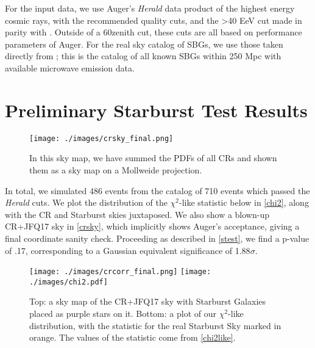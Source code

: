 For the input data, we use Auger's \textit{Herald} data product of the highest energy cosmic rays, with the recommended quality cuts, and the \textgreater 40 EeV cut made in parity with . Outside of a 60\degree zenith cut, these cuts are all based on performance parameters of Auger. For the real sky catalog of SBGs, we use those taken directly from \textcite{starburst}; this is the catalog of all known SBGs within 250 Mpc with available microwave emission data. 
%
 
\section{Preliminary Starburst Test Results}%
\begin{figure}[H]
\centering
\texttt{[image: ./images/crsky\_final.png]}
\caption[CR Sky + JFQ17 Modulation]{In this sky map, we have summed the PDFs of all CRs and shown them as a sky map on a Mollweide projection.}
\label{crsky}
\end{figure}
In total, we simulated 486 events from the catalog of 710 events which passed the \textit{Herald} cuts. We plot the distribution of the $\chi^2$-like statistic below in \autoref{chi2}, along with the CR and Starburst skies juxtaposed. We also show a blown-up CR+JFQ17 sky in \autoref{crsky}, which implicitly shows Auger's acceptance, giving a final coordinate sanity check. Proceeding as described in \autoref{stest}, we find a p-value of .17, corresponding to a Gaussian equivalent significance of 1.88$\sigma$. 
\begin{figure}[H]
\centering
\texttt{[image: ./images/crcorr\_final.png]}
\texttt{[image: ./images/chi2.pdf]}
\caption[Starburst Correlation Test]{Top: a sky map of the CR+JFQ17 sky with Starburst Galaxies placed as purple stars on it. Bottom: a plot of our $\chi^2$-like distribution, with the statistic for the real Starburst Sky marked in orange. The values of the statistic come from \autoref{chi2like}.}
\label{chi2}
\end{figure}

